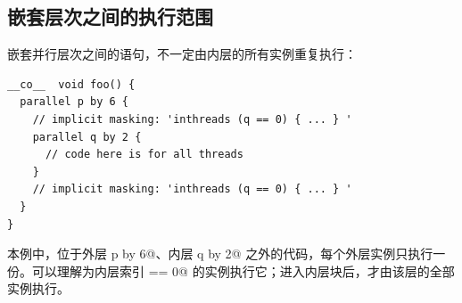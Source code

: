 \subsection*{嵌套层次之间的执行范围}

嵌套并行层次之间的语句，不一定由内层的所有实例重复执行：

\begin{lstlisting}[language=croqtile,caption={隐式掩码}]
__co__  void foo() {
  parallel p by 6 {
    // implicit masking: 'inthreads (q == 0) { ... } '
    parallel q by 2 {
      // code here is for all threads
    }
    // implicit masking: 'inthreads (q == 0) { ... } '
  }
}
\end{lstlisting}

本例中，位于外层 \co@parallel p by 6@、内层 \co@parallel q by 2@ 之外的代码，每个外层实例只执行一份。可以理解为内层索引 \co@q == 0@ 的实例执行它；进入内层块后，才由该层的全部实例执行。
